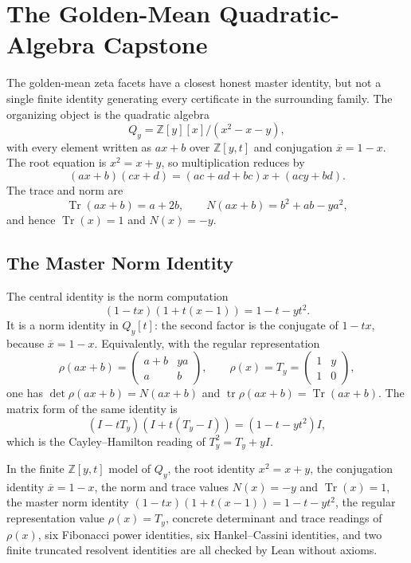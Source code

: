 \chapter{The Golden-Mean Quadratic-Algebra Capstone}
\label{ch:concrete-instances-window6-golden-mean-quadratic-capstone}

The golden-mean zeta facets have a closest honest master identity, but not a single finite identity generating every certificate in the surrounding family. The organizing object is the quadratic algebra
$$
Q_y=\mathbb Z[y][x]/(x^2-x-y),
$$
with every element written as $a x+b$ over $\mathbb Z[y,t]$ and conjugation $\overline{x}=1-x$. The root equation is $x^2=x+y$, so multiplication reduces by
$$
(a x+b)(c x+d)=(ac+ad+bc)x+(acy+bd).
$$
The trace and norm are
$$
\operatorname{Tr}(a x+b)=a+2b,\qquad
N(a x+b)=b^2+ab-ya^2,
$$
and hence $\operatorname{Tr}(x)=1$ and $N(x)=-y$.

\section{The Master Norm Identity}
\label{sec:window6-quadratic-capstone-master}

The central identity is the norm computation
$$
(1-tx)(1+t(x-1))=1-t-yt^2.
$$
It is a norm identity in $Q_y[t]$: the second factor is the conjugate of $1-tx$, because $\overline{x}=1-x$. Equivalently, with the regular representation
$$
\rho(a x+b)=
\begin{pmatrix}
a+b&ya\\
a&b
\end{pmatrix},
\qquad
\rho(x)=T_y=
\begin{pmatrix}
1&y\\
1&0
\end{pmatrix},
$$
one has $\det\rho(a x+b)=N(a x+b)$ and $\operatorname{tr}\rho(a x+b)=\operatorname{Tr}(a x+b)$. The matrix form of the same identity is
$$
(I-tT_y)(I+t(T_y-I))=(1-t-yt^2)I,
$$
which is the Cayley--Hamilton reading of $T_y^2=T_y+yI$.

\begin{theorem}
\label{thm:window6-quadratic-capstone-certificate}
In the finite $\mathbb Z[y,t]$ model of $Q_y$, the root identity $x^2=x+y$, the conjugation identity $\overline{x}=1-x$, the norm and trace values $N(x)=-y$ and $\operatorname{Tr}(x)=1$, the master norm identity $(1-tx)(1+t(x-1))=1-t-yt^2$, the regular representation value $\rho(x)=T_y$, concrete determinant and trace readings of $\rho(x)$, six Fibonacci power identities, six Hankel--Cassini identities, and two finite truncated resolvent identities are all checked by Lean without axioms.
\end{theorem}

